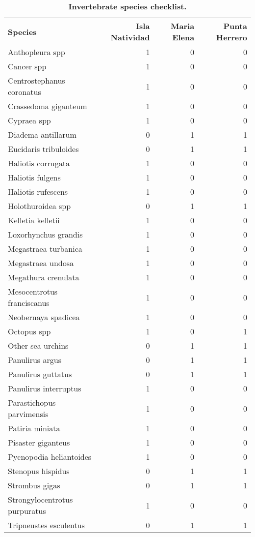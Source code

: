 \begin{table}[t]

\caption{\label{tab:}{\bf Invertebrate species checklist.}}
\centering
\begin{tabular}{lrrr}
\toprule
Species & Isla Natividad & Maria Elena & Punta Herrero\\
\midrule
Anthopleura spp & 1 & 0 & 0\\
Cancer spp & 1 & 0 & 0\\
Centrostephanus coronatus & 1 & 0 & 0\\
Crassedoma giganteum & 1 & 0 & 0\\
Cypraea spp & 1 & 0 & 0\\
\addlinespace
Diadema antillarum & 0 & 1 & 1\\
Eucidaris tribuloides & 0 & 1 & 1\\
Haliotis corrugata & 1 & 0 & 0\\
Haliotis fulgens & 1 & 0 & 0\\
Haliotis rufescens & 1 & 0 & 0\\
\addlinespace
Holothuroidea spp & 0 & 1 & 1\\
Kelletia kelletii & 1 & 0 & 0\\
Loxorhynchus grandis & 1 & 0 & 0\\
Megastraea turbanica & 1 & 0 & 0\\
Megastraea undosa & 1 & 0 & 0\\
\addlinespace
Megathura crenulata & 1 & 0 & 0\\
Mesocentrotus franciscanus & 1 & 0 & 0\\
Neobernaya spadicea & 1 & 0 & 0\\
Octopus spp & 1 & 0 & 1\\
Other sea urchins & 0 & 1 & 1\\
\addlinespace
Panulirus argus & 0 & 1 & 1\\
Panulirus guttatus & 0 & 1 & 1\\
Panulirus interruptus & 1 & 0 & 0\\
Parastichopus parvimensis & 1 & 0 & 0\\
Patiria miniata & 1 & 0 & 0\\
\addlinespace
Pisaster giganteus & 1 & 0 & 0\\
Pycnopodia heliantoides & 1 & 0 & 0\\
Stenopus hispidus & 0 & 1 & 1\\
Strombus gigas & 0 & 1 & 1\\
Strongylocentrotus purpuratus & 1 & 0 & 0\\
\addlinespace
Tripneustes esculentus & 0 & 1 & 1\\
\bottomrule
\end{tabular}
\end{table}